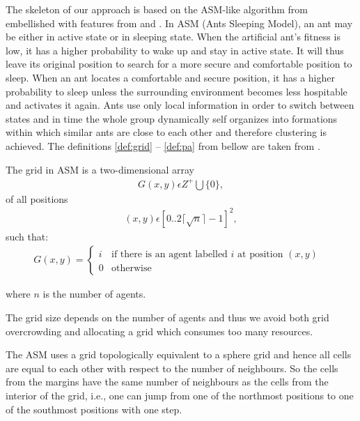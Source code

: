The skeleton of our approach \cite{Gaceanu10AnAdaptive} is based on the ASM-like algorithm from \cite{Chen04AnAdaptive} embellished with features from \cite{Chira07Stigmergic} and \cite{Schockaert04Fuzzy}. 	
In ASM (Ants Sleeping Model), an ant may be either in active state or in sleeping state. When the artificial ant's fitness is low, it has a higher probability to wake up and stay in active state. It will thus leave its original position to search for a more secure and comfortable position to sleep. When an ant locates a comfortable and secure position, it has a higher probability to sleep unless the surrounding environment becomes less hospitable and activates it again. Ants use only local information in order to switch between states and in time the whole group dynamically self organizes into formations within which similar ants are close to each other and therefore clustering is achieved.   
The definitions \ref{def:grid} -- \ref{def:pa} from bellow are taken from \cite{Chen04AnAdaptive}.

\begin{definition}
\label{def:grid}
The grid in ASM is 
 a two-dimensional array
\begin{align} G(x,y)\epsilon Z ^{+} \bigcup \{0\},     \end{align}  
  of all positions  \begin{align}(x,y) \epsilon [0..2\lceil\sqrt{n}\rceil-1]^{2},\end{align} such that:
\begin{align} 
G(x, y) = 
\left\{
\begin{array}{ll}
		i  & \mbox{if there is an agent labelled $i$ at position $(x, y)$ } \\
		0 & \mbox{otherwise }
	\end{array}
\right.
\end{align}
 
where  $n$ is the number of agents.



\end{definition}


\begin{remark}
The grid size depends on the number of agents and thus we avoid both grid overcrowding and allocating a grid which consumes too many resources.
\end{remark}

\begin{remark}
The ASM uses a grid topologically equivalent to a sphere grid and hence all cells are equal to each other with respect to the number of neighbours. So the cells from the margins have the same number of neighbours as the cells from the interior of the grid, i.e., one can jump from one of the northmost positions to one of the southmost positions with one step. 
\end{remark}


